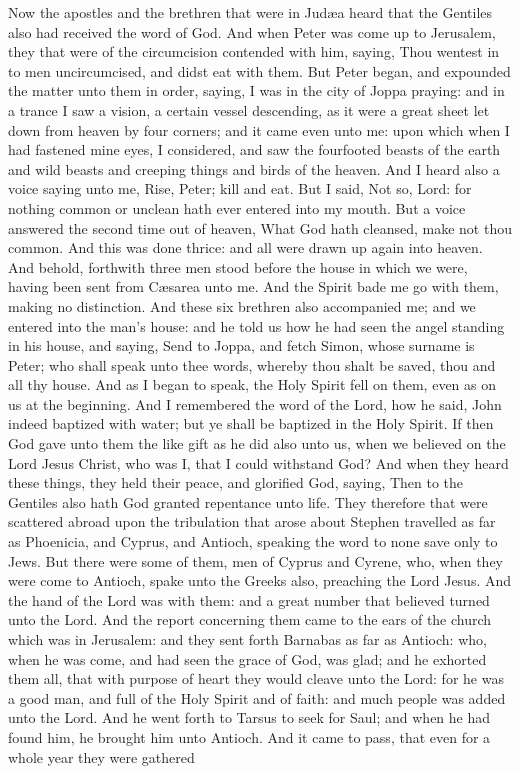 Now the apostles and the brethren that were in Judæa heard that the Gentiles also had received the word of God. And when Peter was come up to Jerusalem, they that were of the circumcision contended with him, saying, Thou wentest in to men uncircumcised, and didst eat with them. But Peter began, and expounded the matter unto them in order, saying, I was in the city of Joppa praying: and in a trance I saw a vision, a certain vessel descending, as it were a great sheet let down from heaven by four corners; and it came even unto me: upon which when I had fastened mine eyes, I considered, and saw the fourfooted beasts of the earth and wild beasts and creeping things and birds of the heaven. And I heard also a voice saying unto me, Rise, Peter; kill and eat. But I said, Not so, Lord: for nothing common or unclean hath ever entered into my mouth. But a voice answered the second time out of heaven, What God hath cleansed, make not thou common. And this was done thrice: and all were drawn up again into heaven. And behold, forthwith three men stood before the house in which we were, having been sent from Cæsarea unto me. And the Spirit bade me go with them, making no distinction. And these six brethren also accompanied me; and we entered into the man’s house: and he told us how he had seen the angel standing in his house, and saying, Send to Joppa, and fetch Simon, whose surname is Peter; who shall speak unto thee words, whereby thou shalt be saved, thou and all thy house. And as I began to speak, the Holy Spirit fell on them, even as on us at the beginning. And I remembered the word of the Lord, how he said, John indeed baptized with water; but ye shall be baptized in the Holy Spirit. If then God gave unto them the like gift as he did also unto us, when we believed on the Lord Jesus Christ, who was I, that I could withstand God? And when they heard these things, they held their peace, and glorified God, saying, Then to the Gentiles also hath God granted repentance unto life.  They therefore that were scattered abroad upon the tribulation that arose about Stephen travelled as far as Phoenicia, and Cyprus, and Antioch, speaking the word to none save only to Jews. But there were some of them, men of Cyprus and Cyrene, who, when they were come to Antioch, spake unto the Greeks also, preaching the Lord Jesus. And the hand of the Lord was with them: and a great number that believed turned unto the Lord. And the report concerning them came to the ears of the church which was in Jerusalem: and they sent forth Barnabas as far as Antioch: who, when he was come, and had seen the grace of God, was glad; and he exhorted them all, that with purpose of heart they would cleave unto the Lord: for he was a good man, and full of the Holy Spirit and of faith: and much people was added unto the Lord. And he went forth to Tarsus to seek for Saul; and when he had found him, he brought him unto Antioch. And it came to pass, that even for a whole year they were gathered 